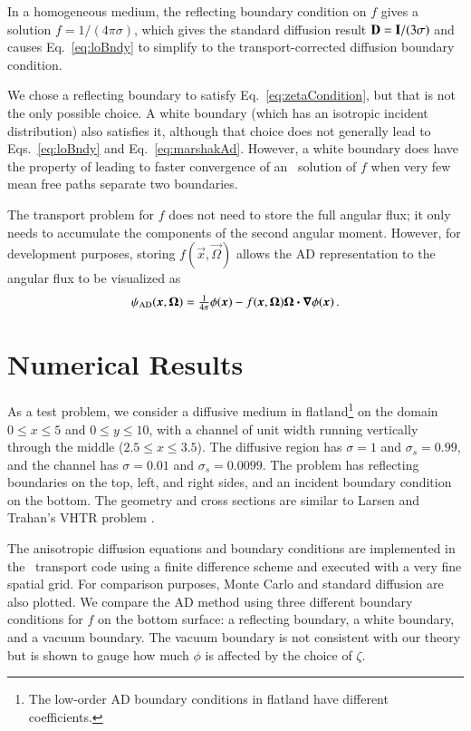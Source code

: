 \documentclass{anstrans}
\begin{document}
In a homogeneous medium, the reflecting boundary condition on $f$ gives a
solution
$f=1/(4\pi\sigma)$, which gives the standard diffusion result $\mathbf{D}=
\mathbf{I}/(3\sigma)$ and causes Eq.~\eqref{eq:loBndy} to simplify to
the transport-corrected diffusion boundary condition.

We chose a reflecting boundary to satisfy Eq.~\eqref{eq:zetaCondition}, but that
is not the only possible choice. A white boundary (which has an isotropic
incident
distribution) also satisfies it,
although that choice does not generally lead to Eqs.~\eqref{eq:loBndy} and
Eq.~\eqref{eq:marshakAd}. However, a white boundary does have the property of
leading to faster convergence of an \SN\ solution of $f$ when very few mean free
paths separate two boundaries.

The transport problem for $f$ does not need to store the full angular flux; it
only needs to accumulate the components of the second angular moment. However,
for development purposes, storing $f(\vec{x},\vec{\Omega})$ allows the AD
representation to the angular flux to be visualized as
\begin{equation*}
  \psi_\text{AD}(\bm{x},\bm{\Omega}) = \tfrac{1}{4\pi} \phi(\bm{x})
  - f(\bm{x},\bm{\Omega}) \bm{\Omega} \bm{\cdot} \bm{\nabla} \phi(\bm{x})\,.
\end{equation*}

\section{Numerical Results}
As a test problem, we consider a diffusive medium in flatland\footnote{The
low-order AD boundary conditions in flatland have different coefficients.} on
the domain $0
\le x \le 5$ and $0 \le y \le 10$, with a channel of unit width running
vertically through the middle ($2.5 \le x \le 3.5$). The diffusive region has
$\sigma=1$ and
$\sigma_s=0.99$, and the channel has $\sigma=0.01$ and $\sigma_s=0.0099$. The
problem has
reflecting boundaries on the top, left, and right sides, and an incident
boundary condition on the bottom. The geometry and cross sections are similar
to Larsen
and Trahan's VHTR problem \cite{Lar2009c}.

The anisotropic diffusion equations and boundary conditions are implemented
in the \pytrt\ transport code \cite{Pytrt} using a finite difference scheme
and executed with a very fine spatial grid. For comparison
purposes, Monte Carlo and standard diffusion are also plotted.
We compare the AD method using three different boundary conditions for $f$ on
the bottom surface: a reflecting boundary, a white boundary, and a vacuum
boundary. The vacuum boundary is not consistent with our theory but
is shown to gauge how much $\phi$ is affected by the choice of $\zeta$.
\end{document}

